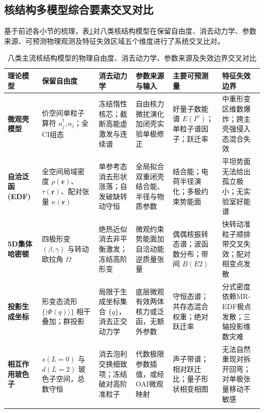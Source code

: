 \subsection{核结构多模型综合要素交叉对比}\label{sec:2-8-4}

基于前述各小节的梳理，表\ref{tab:2-8-cross-model-comparison}对八类核结构模型在保留自由度、消去动力学、参数来源、可预测物理观测及特征失效区域五个维度进行了系统交叉比对。

\begin{table}[htbp]
\centering
\footnotesize
\setlength{\tabcolsep}{3pt}
\caption{八类主流核结构模型的物理自由度、消去动力学、参数来源及失效边界交叉对比}\label{tab:2-8-cross-model-comparison}
\begin{tabularx}{\textwidth}{>{\raggedright\arraybackslash\hsize=0.65\hsize}X >{\raggedright\arraybackslash\hsize=1.0\hsize}X >{\raggedright\arraybackslash\hsize=1.0\hsize}X >{\raggedright\arraybackslash\hsize=1.1\hsize}X >{\raggedright\arraybackslash\hsize=1.1\hsize}X >{\raggedright\arraybackslash\hsize=1.15\hsize}X}
\toprule
\textbf{理论模型} & \textbf{保留自由度} & \textbf{消去动力学} & \textbf{参数来源与输入} & \textbf{主要可预测量} & \textbf{特征失效边界} \\ \midrule
\textbf{微观壳模型} & 价空间单粒子算符 $a^\dagger_j, a_j$；全CI组态 & 冻结惰性核芯；截断高能虚激发与连续谱 & 自由核力微扰演化加闭壳实验单极修正 & 好量子数能谱 $E(I^\pi)$；单粒子谱因子；跃迁率 & 中重形变区维数爆炸；跨主壳强侵入态混合失效 \\ \addlinespace
\textbf{自洽泛函 (EDF)} & 全空间局域密度 $\rho(\mathbf{r})$、$\tau(\mathbf{r})$、配对张量 $\kappa(\mathbf{r})$ & 单参考态消去形状涨落；自发破缺转动守恒 & 全局拟合双重闭壳结合能、半径与物质参数 & 结合能；电荷半径演化；多极约束势能面 & 平坦势面无法给出孤立极小；无实验室好能谱 \\ \addlinespace
\textbf{5D集体哈密顿} & 四极形变 $(\beta, \gamma)$ 与转动欧拉角 $\Omega$ & 绝热近似消去非平衡激发；冻结高阶形变 & 微观约束势能面加自洽动能逆质量张量 & 偶偶核振转态谱；波函数分布；带间 $B(E2)$ & 快转动准粒子顺排带交叉失效；配对相变点发散 \\ \addlinespace
\textbf{投影生成坐标} & 形变态流形 $\{|\Phi(q)\rangle\}$ 相干叠加；群投影 & 局限于生成坐标集合 $\{q\}$，消去正交动力学 & 底层微观有效两体核力或泛函，无额外参数 & 守恒态谱；共存态混合权重；绝对跃迁率 & 分式密度依赖MR-EDF极点发散；三轴投影维数灾难 \\ \addlinespace
\textbf{相互作用玻色子} & $s(L=0)$ 与 $d(L=2)$ 玻色子空间，总数守恒 & 消去泡利交换细致项；冻结破对高阶准粒子 & 代数极限参数插值，或经OAI微观映射 & 声子带谱；相对跃迁比；量子形状相变相图 & 无法自然重现对拆开回弯；对单极张量移动不敏感 \\ \addlinespace

\end{tabularx}
\end{table}
